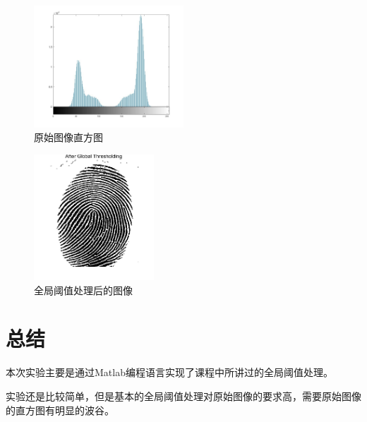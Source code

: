 \documentclass{../source/Experiment}
\begin{document}
\begin{figure}[H]
    \centering
    \includegraphics[width = 0.5\textwidth]{第五次/lab5-2.jpg}
    \caption{原始图像直方图}
\end{figure}

\begin{figure}[H]
    \centering
    \includegraphics[width = 0.4\textwidth]{第五次/lab5-3.jpg}
    \caption{全局阈值处理后的图像}
\end{figure}


\section{总结}
本次实验主要是通过Matlab编程语言实现了课程中所讲过的全局阈值处理。

实验还是比较简单，但是基本的全局阈值处理对原始图像的要求高，需要原始图像的直方图有明显的波谷。
\end{document}
